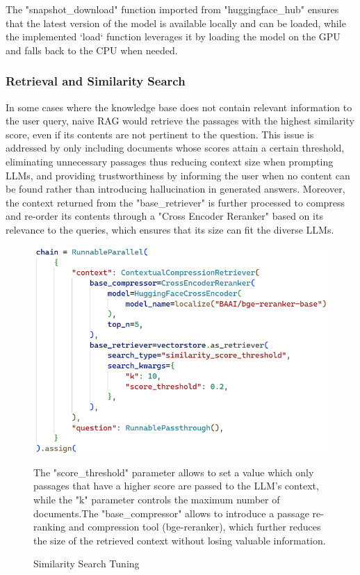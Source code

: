 The "snapshot\_download" function imported from "huggingface\_hub" ensures that the latest version of the model is available locally and can be loaded, while the implemented `load` function leverages it by loading the model on the GPU and falls back to the CPU when needed.
\subsubsection{Retrieval and Similarity Search}
In some cases where the knowledge base does not contain relevant information to the user query, naive RAG would retrieve the passages with the highest similarity score, even if its contents are not pertinent to the question. This issue is addressed by only including documents whose scores attain a certain threshold, eliminating unnecessary passages thus reducing context size when prompting LLMs, and providing trustworthiness by informing the user when no content can be found rather than introducing hallucination in generated answers.\newline
Moreover, the context returned from the "base\_retriever" is further processed to compress and re-order its contents through a "Cross Encoder Reranker" based on its relevance to the queries, which ensures that its size can fit the diverse LLMs.
\begin{figure}[H]
    \centering
    \includegraphics[width=.9\linewidth]{./figures/similarity_search_threshold.png}
    \caption{Similarity Search Tuning}
    \begin{flushleft}
        \small The "score\_threshold" parameter allows to set a value which only passages that have a higher score are passed to the LLM's context, while the "k" parameter controls the maximum number of documents.\newline The "base\_compressor" allows to introduce a passage re-ranking and compression tool (bge-reranker), which further reduces the size of the retrieved context without losing valuable information.
    \end{flushleft}
\end{figure}
